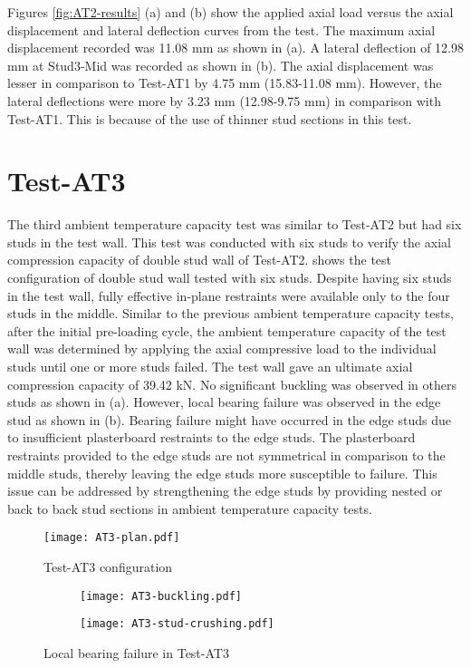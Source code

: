 Figures \ref{fig:AT2-results} (a) and (b) show the applied axial load versus the axial displacement and lateral deflection curves from the test. The maximum axial displacement recorded was 11.08 mm as shown in  (a). A lateral deflection of 12.98 mm at Stud3-Mid was recorded as shown in  (b). The axial displacement was lesser in comparison to Test-AT1 by 4.75 mm (15.83-11.08 mm). However, the lateral deflections were more by 3.23 mm (12.98-9.75 mm) in comparison with Test-AT1. This is because of the use of thinner stud sections in this test.

\section{Test-AT3}\label{sec:AT3}

The third ambient temperature capacity test was similar to Test-AT2 but had six studs in the test wall. This test was conducted with six studs to verify the axial compression capacity of double stud wall of Test-AT2.  shows the test configuration of double stud wall tested with six studs. Despite having six studs in the test wall, fully effective in-plane restraints were available only to the four studs in the middle. Similar to the previous ambient temperature capacity tests, after the initial pre-loading cycle, the ambient temperature capacity of the test wall was determined by applying the axial compressive load to the individual studs until one or more studs failed. The test wall gave an ultimate axial compression capacity of 39.42 kN. No significant buckling was observed in others studs as shown in  (a). However, local bearing failure was observed in the edge stud as shown in  (b). Bearing failure might have occurred in the edge studs due to insufficient plasterboard restraints to the edge studs. The plasterboard restraints provided to the edge studs are not symmetrical in comparison to the middle studs, thereby leaving the edge studs more susceptible to failure. This issue can be addressed by strengthening the edge studs by providing nested or back to back stud sections in ambient temperature capacity tests. 
\begin{figure}[!htbp]
	\centering
			\texttt{[image: AT3-plan.pdf]}\\
		\caption{Test-AT3 configuration}
		\label{fig:AT3-plan}
\end{figure} 
\begin{figure}[!htbp]
	\centering
	\begin{subfigure}[b]{0.6\textwidth}
		\centering
		\texttt{[image: AT3-buckling.pdf]}
		\caption{}
		\label{subfig:AT3-stud-buckling}
	\end{subfigure}
	\begin{subfigure}[b]{0.5\textwidth}
		\centering
		\texttt{[image: AT3-stud-crushing.pdf]}
		\caption{}
		\label{subfig:AT3-stud-crushing}
	\end{subfigure}
	   \caption{Local bearing failure in Test-AT3}
	   \label{fig:AT3-buckling}
\end{figure} 

